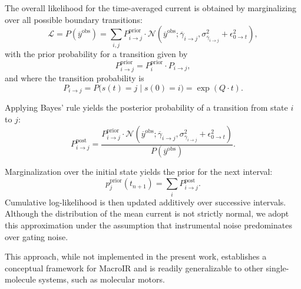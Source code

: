 \documentclass[pdflatex,sn-nature]{sn-jnl}%
\begin{document}
The overall likelihood for the time-averaged current is obtained by marginalizing over all possible boundary transitions:
\[
\mathcal{L} = P\left(\overline{y}^{\text{obs}}\right) = \sum_{i,j} P^{\text{prior}}_{i\rightarrow j} \cdot \mathcal{N}\left(\overline{y}^{\text{obs}}; \overline{\gamma}_{i\rightarrow j}, \sigma^2_{\overline{\gamma}_{i\rightarrow j}} + \epsilon^2_{0 \rightarrow t}\right),
\]
with the prior probability for a transition given by
\[
P^{\text{prior}}_{i\rightarrow j} = P^{\text{prior}}_i \cdot P_{i\rightarrow j},
\]
and where the transition probability is 
\[
P_{i\rightarrow j} = P\big(s(t)=j \mid s(0)=i\big) = \exp\left(Q \cdot t\right).
\]

Applying Bayes' rule yields the posterior probability of a transition from state $i$ to $j$:
\[
P^{\text{post}}_{i\rightarrow j} = \frac{P^{\text{prior}}_{i\rightarrow j} \cdot \mathcal{N}\left(\overline{y}^{\text{obs}}; \overline{\gamma}_{i\rightarrow j}, \sigma^2_{\overline{\gamma}_{i\rightarrow j}} + \epsilon^2_{0 \rightarrow t}\right)}{P\left(\overline{y}^{\text{obs}}\right)}.
\]

Marginalization over the initial state yields the prior for the next interval:
\begin{equation}
	p_j^{\text{prior}}(t_{n+1}) = \sum_i P^{\text{post}}_{i\rightarrow j}.
	\label{eq:next_prior_short}
\end{equation}
Cumulative log-likelihood is then updated additively over successive intervals. Although the distribution of the mean current is not strictly normal, we adopt this approximation under the assumption that instrumental noise predominates over gating noise.

This approach, while not implemented in the present work, establishes a conceptual framework for MacroIR and is readily generalizable to other single-molecule systems, such as molecular motors.
\end{document}
